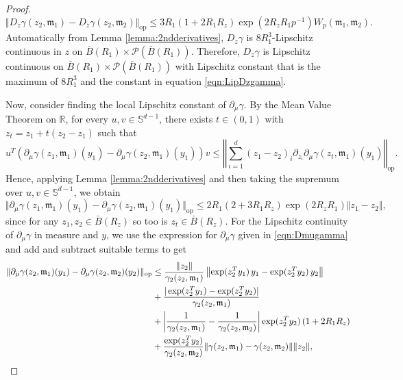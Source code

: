 \documentclass[10pt,a4paper]{amsart}
\newcommand{\R}{\mathbb{R}}
\begin{document}
\begin{proof}
\begin{equation}\label{eqn:LipDzgamma}
   \Vert D_z\gamma(z_2,\mathfrak{m}_1)-D_{z}\gamma(z_2,\mathfrak{m}_2)\Vert_\mathrm{op}\le 3R_1(1+2R_1R_z) \exp(2R_zR_1p^{-1}) W_p(\mathfrak{m}_1,\mathfrak{m}_2).
\end{equation}
 Automatically from Lemma \ref{lemma:2ndderivatives}, $D_z\gamma$ is $8R_1^3$-Lipschitz continuous in $z$ on $\bar B(R_1)\times \mathcal P(\bar B(R_1))$. Therefore, $D_z\gamma$ is Lipschitz continuous on $\bar B(R_1)\times \mathcal P(\bar B(R_1))$ with Lipschitz constant that is the maximum of $8R_1^3$ and the constant in equation \eqref{eqn:LipDzgamma}.

Now, consider finding the local Lipschitz constant of $\partial_\mu\gamma$. By the Mean Value Theorem on $\R$, for every $u,v\in \mathbb S^{d-1}$, there exists $t\in(0,1)$ with $z_t=z_1+t(z_2-z_1)$ such that
\[
u^T\left( \partial_\mu\gamma(z_1,\mathfrak{m}_1)(y_1)-\partial_\mu\gamma(z_2,\mathfrak{m}_1)(y_1)\right)v\le \left\Vert \sum_{i=1}^d (z_1-z_2)_i \partial_{z_i}\partial_\mu \gamma(z_t,\mathfrak{m}_1)(y_1) \right\Vert_\mathrm{op}.
\]
Hence, applying Lemma \ref{lemma:2ndderivatives} and then taking the supremum over $u,v \in \mathbb S^{d-1}$, we obtain
\begin{equation}\label{eqn:LipDmugamma3}
  \Vert \partial_\mu\gamma(z_1,\mathfrak{m}_1)(y_1)-\partial_\mu\gamma(z_2,\mathfrak{m}_1)(y_1)\Vert_\mathrm{op}\le 2R_1(2+3R_1R_z) \exp(2R_zR_1) \Vert z_1-z_2\Vert,   
\end{equation}
since for any $z_1,z_2\in \bar B(R_z)$ so too is $z_t\in \bar B(R_z)$. For the Lipschitz continuity of $\partial_\mu \gamma$ in measure and $y$, we use the expression for $\partial_\mu \gamma$ given in  \eqref{eqn:Dmugamma} and add and subtract suitable terms to get 
\begin{align}
    \Vert \partial_\mu\gamma(z_2,\mathfrak{m}_1)(y_1)-\partial_\mu\gamma(z_2,\mathfrak{m}_2)(y_2)\Vert_\mathrm{op}&\le \frac{\Vert z_2\Vert}{\gamma_2(z_2,\mathfrak{m}_1)}\left\Vert \exp(z_2^Ty_1)\,y_1-\exp(z_2^Ty_2)\,y_2\right\Vert\notag\\&+ \frac{\vert \exp(z_2^Ty_1)-\exp(z_2^Ty_2)\vert}{\gamma_2(z_2,\mathfrak{m}_1)}\notag\\&+\left\vert \frac{1}{\gamma_2(z_2,\mathfrak{m}_1)}-\frac{1}{\gamma_2(z_2,\mathfrak{m}_2)}\right\vert\exp(z_2^Ty_2)\left(1+2R_1R_z \right)\notag\\
    &+\frac{\exp(z_2^Ty_2)}{\gamma_2(z_2,\mathfrak{m}_2)}\Vert \gamma(z_2,\mathfrak{m}_1)-\gamma(z_2,\mathfrak{m}_2)\Vert \Vert z_2\Vert,\label{eqn:LipDmugamma}

\end{align}
\end{proof}
\end{document}
